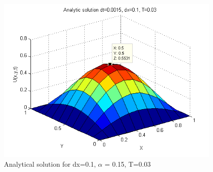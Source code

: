 \documentclass[a4paper,10pt]{article}
\begin{document}
\begin{figure}
  \begin{center}
    \includegraphics[scale=0.5]{ana_dt00015_dx01_T003}
    \caption{Analytical solution for dx=0.1, $\alpha$ = 0.15, T=0.03}
    \label{fig:Ana_alpha0.15}
  \end{center}

\end{figure}
\end{document}
